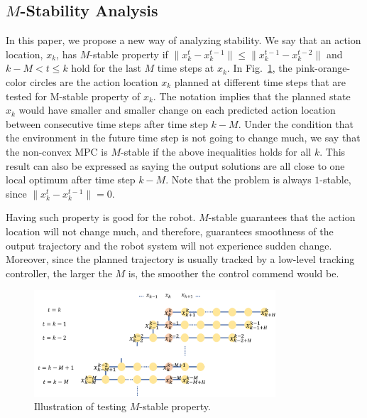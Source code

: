 \documentclass{ifacconf}
\begin{document}
\subsection{$M$-Stability Analysis}
In this paper, we propose a new way of analyzing stability.
We say that an action location, $x_{k}$, has $M$-stable property if $\|x_{k}^t-x_k^{t-1}\|\leq \|x_k^{t-1}-x_k^{t-2}\|$ and $k-M< t\leq k$ hold for the last $M$ time steps at $x_{k}$. In Fig.~\ref{fig:m-stable}, the pink-orange-color circles are the action location $x_{k}$ planned at different time steps that are  tested for M-stable property of $x_{k}$. The notation implies that the planned state $x_k$ would have smaller and smaller change on each predicted action location between consecutive time steps after time step $k-M$. Under the condition that the environment in the future time step is not going to change much, we say that the non-convex MPC is $M$-stable if the above inequalities holds for all $k$. This result can also be expressed as saying the output solutions are all close to one local optimum after time step $k-M$. Note that the problem is always $1$-stable, since $\|x_{k}^t-x_k^{t-1}\|=0$.

Having such property is good for the robot. $M$-stable guarantees that the action location will not change much, and therefore, guarantees smoothness of the output trajectory and the robot system will not experience sudden change. Moreover, since the planned trajectory is usually tracked by a low-level tracking controller, the larger the $M$ is, the smoother the control commend would be.

\begin{figure}[t]
\begin{center}
\includegraphics[width=9cm]{src/Mstable.png}
\caption{Illustration of testing $M$-stable property.}
\label{fig:m-stable}
\end{center}
\end{figure}
\end{document}
